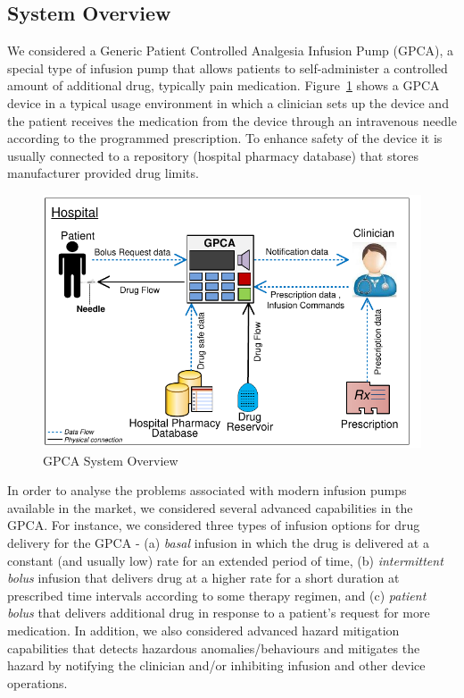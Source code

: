 \subsection {System Overview}
We considered a Generic Patient Controlled Analgesia Infusion Pump (GPCA), a special type of infusion pump that allows patients to self-administer a controlled amount of additional drug, typically pain medication. Figure~\ref{fig:gpca-overview} shows a GPCA device in a typical usage environment in which a clinician sets up the device and the patient receives the medication from the device through an intravenous needle according to the programmed prescription. To enhance safety of the device it is usually connected to a repository (hospital pharmacy database) that stores manufacturer provided drug limits.
 \begin{figure}[h!]
    \centering
    \includegraphics[scale=0.6]{images/Overview.pdf}
    \caption{GPCA System Overview}
    \label{fig:gpca-overview}
 \end{figure}
In order to analyse the problems associated with modern infusion pumps available in the market, we considered several advanced capabilities in the GPCA. For instance, we considered three types of infusion options for drug delivery for the GPCA - (a) \emph{basal} infusion in which the drug is delivered at a constant (and usually low) rate for an extended period of
time, (b) \emph{intermittent bolus} infusion that delivers drug at a higher rate for a short duration at prescribed time intervals according to some therapy regimen, and (c) \emph{patient bolus} that delivers additional drug in response to a patient's request for more medication. In addition, we also considered advanced hazard mitigation capabilities that detects hazardous anomalies/behaviours and mitigates the hazard by notifying the clinician and/or inhibiting infusion and other device operations.

